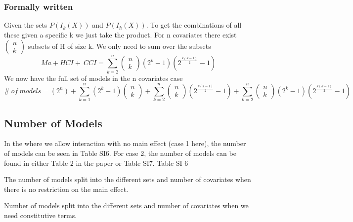 \subsubsection{Formally written}

Given the sets $P\left(I_k\left(X\right)\right)$ and $P\left(I_h\left(X\right)\right)$. To get the combinations of all these given a specific k we just take the product. For n covariates there exist $\left( \begin{array}{c}
n \\ 
k \end{array}
\right)$ subsets of H of size k. We only need to sum over the subsets
\[Ma+HCI+\ CCI=\sum^n_{k=2}{\left( \begin{array}{c}
n \\ 
k \end{array}
\right)\left(2^k-1\right)\left(2^{\frac{k\left(k-1\right)}{2}}-1\right)}\] 
We now have the full set of models in the n covariates case
\[\#\ of\ models=\left(2^n\right)+\sum^n_{k=1}{\left(2^k-1\right)\left( \begin{array}{c}
n \\ 
k \end{array}
\right)}+\sum^n_{k=2}{\left( \begin{array}{c}
n \\ 
k \end{array}
\right)\left(2^{\frac{k\left(k-1\right)}{2}}-1\right)}+\sum^n_{k=2}{\left( \begin{array}{c}
n \\ 
k \end{array}
\right)\left(2^k-1\right)\left(2^{\frac{k\left(k-1\right)}{2}}-1\right)}\] 
\subsection{Number of Models}

\noindent In the where we allow interaction with no main effect (case 1 here), the number of models can be seen in Table SI6. For case 2, the number of models can be found in either Table 2 in the paper or Table SI7. Table SI 6



\noindent The number of models split into the different sets and number of covariates when there is no restriction on the main effect.



\noindent Number of models split into the different sets and number of covariates when we need constitutive terms.


